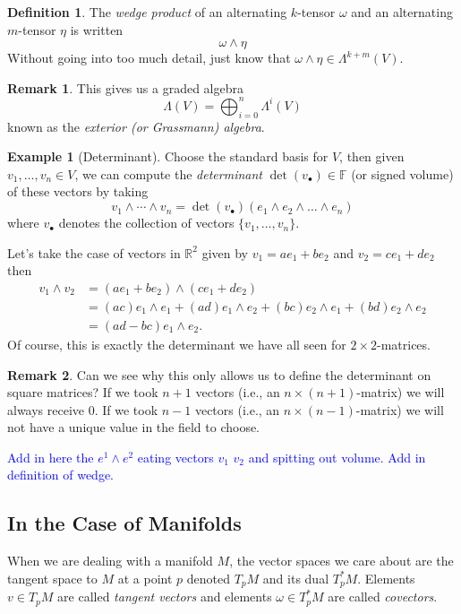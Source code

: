 \documentclass[12pt]{article}
\newcommand{\R}{\mathbb{R}}
\newcommand{\field}{\mathbb{F}}
\theoremstyle{definition}
\newtheorem{definition}{Definition}[section]
\newtheorem{example}{Example}[section]
\newtheorem{remark}{Remark}[section]
\begin{document}
\begin{definition}
The \emph{wedge product} of an alternating $k$-tensor $\omega$ and an alternating $m$-tensor $\eta$ is written
\[
\omega \wedge \eta
\]
Without going into too much detail, just know that $\omega\wedge \eta \in \Lambda^{k+m}(V)$.
\end{definition}

\begin{remark}
This gives us a graded algebra 
\[
\Lambda(V)=\bigoplus_{i=0}^n \Lambda^i(V)
\]
known as the \emph{exterior (or Grassmann) algebra}.
\end{remark}

\begin{example}[Determinant]
Choose the standard basis for $V$, then given $v_1,\dots,v_n\in V$, we can compute the \emph{determinant} $\det(v_\bullet)\in \field$ (or signed volume) of these vectors by taking
\[
v_1\wedge \cdots \wedge v_n = \det(v_\bullet) (e_1\wedge e_2 \wedge \dots \wedge e_n)
\]
where $v_\bullet$ denotes the collection of vectors $\{v_1,\dots,v_n\}$.

Let's take the case of vectors in $\R^2$ given by $v_1=ae_1+be_2$ and $v_2=ce_1+de_2$ then
\begin{align*}
v_1\wedge v_2 &= (ae_1+be_2)\wedge (ce_1+de_2)\\
&= (ac)e_1\wedge e_1 + (ad)e_1\wedge e_2 + (bc)e_2\wedge e_1 + (bd)e_2\wedge e_2\\
&= (ad-bc)e_1\wedge e_2.
\end{align*}
Of course, this is exactly the determinant we have all seen for $2\times 2$-matrices. 
\end{example}

\begin{remark}
Can we see why this only allows us to define the determinant on square matrices?  If we took $n+1$ vectors (i.e., an $n\times (n+1)$-matrix) we will always receive 0.  If we took $n-1$ vectors (i.e., an $n\times (n-1)$-matrix) we will not have a unique value in the field to choose.
\end{remark}

\textcolor{blue}{Add in here the $e^1\wedge e^2$ eating vectors $v_1$ $v_2$ and spitting out volume.  Add in definition of wedge.}


\subsection{In the Case of Manifolds}
When we are dealing with a manifold $M$, the vector spaces we care about are the tangent space to $M$ at a point $p$ denoted $T_pM$ and its dual $T_p^*M$.  Elements $v\in T_pM$ are called \emph{tangent vectors} and elements $\omega \in T_p^*M$ are called \emph{covectors}.
\end{document}
